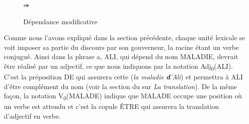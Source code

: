 \begin{figure}
\begin{minipage}[c]{.15\textwidth}\centering%
\end{minipage}
\begin{minipage}[c]{.1\textwidth}\centering⇒\end{minipage}
\begin{minipage}[c]{.15\textwidth}\centering%
\end{minipage}
\caption{Dépendance modificative}
\end{figure}

Comme nous l’avons expliqué dans la section précédente, chaque unité lexicale se voit imposer sa partie du discours par son gouverneur, la racine étant un verbe conjugué. Ainsi dans la phrase a, ALI, qui dépend du nom MALADIE, devrait être réalisé par un adjectif, ce que nous indiquons par la notation Adj\textsubscript{0}(ALI). C’est la préposition DE qui assurera cette  (\textit{la maladie} \textbf{\textit{d}}\textit{’Ali}) et permettra à ALI d’être complément du nom (voir la section du  sur \textit{La translation}). De la même façon, la notation V\textsubscript{0}(MALADE) indique que MALADE occupe une position où un verbe est attendu et c’est la copule ÊTRE qui assurera la translation d’adjectif en verbe.


